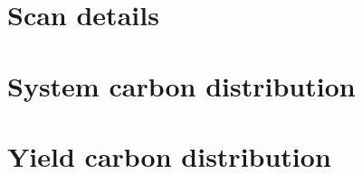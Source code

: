 \documentclass[a4paper]{article}
\begin{document}
\section{Scan details}


\section{System carbon distribution}


\section{Yield carbon distribution}
\end{document}
